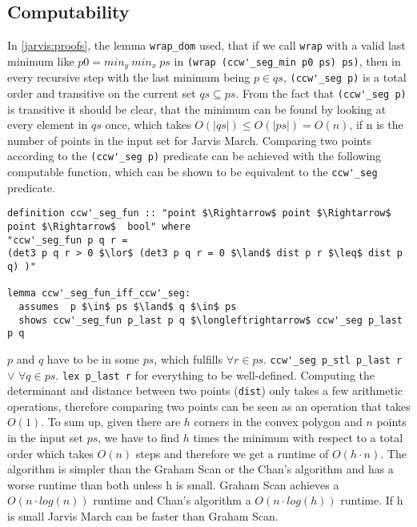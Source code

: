 \subsection{Computability}
In \ref*{jarvis:proofs}, the lemma \lstinline|wrap_dom| used, that if we 
call \lstinline|wrap| with a valid last minimum like $p0 = min_y \: min_x \: ps$ in
\lstinline|(wrap (ccw'_seg_min p0 ps) ps)|, then in every 
recursive step with the last minimum being $p \in qs$, \lstinline|(ccw'_seg p)| is a total 
order and transitive on the current set $qs \subseteq ps$. From the fact that \lstinline|(ccw'_seg p)|
is transitive it should be clear, that the minimum can be found by looking at every element 
in $qs$ once, which takes $O(|qs|) \leq O(|ps|) = O(n)$, if n is the number of points in the 
input set for Jarvis March. Comparing two points according to the \lstinline|(ccw'_seg p)|
predicate can be achieved with the following computable function, which can be shown to 
be equivalent to the \lstinline|ccw'_seg| predicate.
\begin{lstlisting}
definition ccw'_seg_fun :: "point $\Rightarrow$ point $\Rightarrow$ point $\Rightarrow$  bool" where
"ccw'_seg_fun p q r = 
(det3 p q r > 0 $\lor$ (det3 p q r = 0 $\land$ dist p r $\leq$ dist p q) )"

lemma ccw'_seg_fun_iff_ccw'_seg:
  assumes  p $\in$ ps $\land$ q $\in$ ps
  shows ccw'_seg_fun p_last p q $\longleftrightarrow$ ccw'_seg p_last p q
\end{lstlisting}
$p$ and $q$ have to be in some $ps$, which fulfills
$\forall r  \in ps.$ \lstinline|ccw'_seg p_stl p_last r| $\lor$ 
$\forall q \in ps.$ \lstinline|lex p_last r| for everything to be well-defined.
Computing the determinant and distance between two points (\lstinline|dist|) only takes
a few arithmetic operations, therefore comparing two points can be seen as an operation 
that takes $O(1)$. 
To sum up, given there are $h$ corners in the convex polygon and $n$ points in the 
input set $ps$, we have to find $h$ times the minimum with respect to a total order
which takes $O(n)$ steps and therefore we get a runtime of $O(h \cdot n)$.
The algorithm is simpler than the Graham Scan or the Chan's algorithm and has a worse
runtime than both unless h is small. Graham Scan achieves a $O(n \cdot log(n))$ runtime and 
Chan's algorithm a $O(n \cdot log(h))$ runtime. If h is small Jarvis March 
can be faster than Graham Scan.



